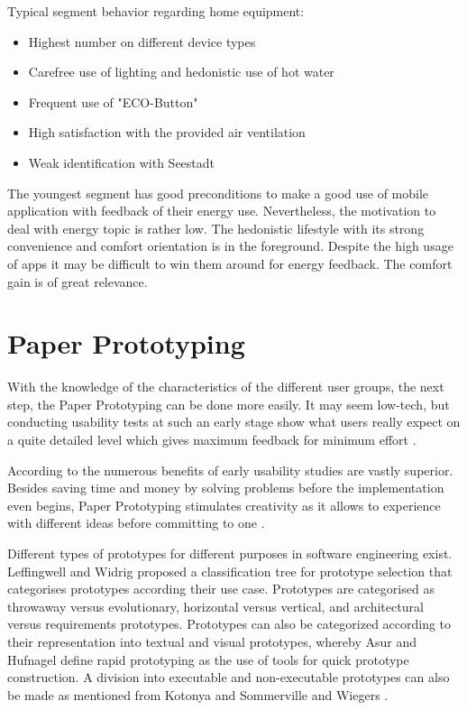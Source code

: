 Typical segment behavior regarding home equipment:
\begin{itemize}
	\item Highest number on different device types
	\item Carefree use of lighting and hedonistic use of hot water
	\item Frequent use of "ECO-Button"
	\item High satisfaction with the provided air ventilation
	\item Weak identification with Seestadt
\end{itemize}

The youngest segment has good preconditions to make a good use of mobile application with feedback of their energy use. Nevertheless, the motivation to deal with energy topic is rather low. The hedonistic lifestyle with its strong convenience and comfort orientation is in the foreground. Despite the high usage of apps it may be difficult to win them around for energy feedback. The comfort gain is of great relevance.

\section{Paper Prototyping}
With the knowledge of the characteristics of the different user groups, the next step, the Paper Prototyping can be done more easily. It may seem low-tech, but conducting usability tests at such an early stage show what users really expect on a quite detailed level which gives maximum feedback for minimum effort \cite{weiss2003handheld}.

According to \cite{lancaster2004paper} the numerous benefits of early usability studies are vastly superior. Besides saving time and money by solving problems before the implementation even begins, Paper Prototyping stimulates creativity as it allows to experience with different ideas before committing to one \cite{snyder2003paper}.

Different types of prototypes for different purposes in software engineering exist. Leffingwell and Widrig \cite{leffingwellmanaging} proposed a classification tree for prototype selection that categorises prototypes according their use case. Prototypes are categorised as throwaway versus evolutionary, horizontal versus vertical, and architectural versus requirements prototypes. Prototypes can also be categorized according to their representation into textual and visual prototypes, whereby Asur and Hufnagel \cite{asur1993taxonomy} define rapid prototyping as the use of tools for quick prototype construction. A division into executable and non-executable prototypes can also be made as mentioned from Kotonya and Sommerville \cite{kotonya1998requirements} and Wiegers \cite{wiegers2013software}.

